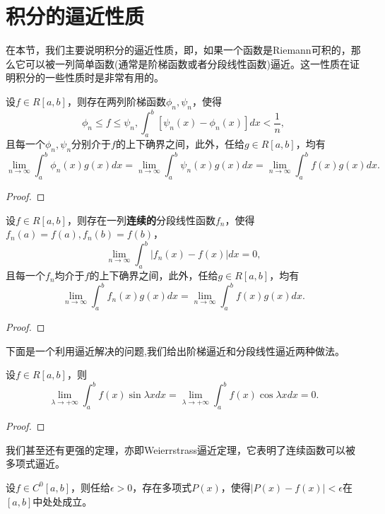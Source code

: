     \section{积分的逼近性质}
    在本节，我们主要说明积分的逼近性质，即，如果一个函数是Riemann可积的，那么它可以被一列简单函数(通常是阶梯函数或者分段线性函数)逼近。这一性质在证明积分的一些性质时是非常有用的。
    \begin{theorem}[阶梯逼近]
        设$f\in R\left[a,b\right]$，则存在两列阶梯函数$\phi_n,\psi_n$，使得$$\phi_n\leq f\leq\psi_n,\int_{a}^{b}\left[\psi_n(x)-\phi_n(x)\right]dx<\frac{1}{n},$$
        且每一个$\phi_n,\psi_n$分别介于$f$的上下确界之间，此外，任给$g\in R\left[a,b\right]$，均有$$\lim\limits_{n\rightarrow\infty}\int_{a}^{b}\phi_n(x)g(x)dx = \lim\limits_{n\rightarrow\infty}\int_{a}^{b}\psi_n(x)g(x)dx = \lim\limits_{n\rightarrow\infty}\int_{a}^{b}f(x)g(x)dx.$$
    \end{theorem}
    \begin{proof}
        
    \end{proof}
    \begin{theorem}[分段线性逼近]
        设$f\in R\left[a,b\right]$，则存在一列\textbf{连续的}分段线性函数$f_n$，使得$f_n(a)=f(a),f_n(b)=f(b)$，$$\lim\limits_{n\rightarrow\infty}\int_{a}^{b}\left|f_n(x)-f(x)\right|dx =0,$$
        且每一个$f_n$均介于$f$的上下确界之间，此外，任给$g\in R\left[a,b\right]$，均有$$\lim\limits_{n\rightarrow\infty}\int_{a}^{b}f_n(x)g(x)dx = \lim\limits_{n\rightarrow\infty}\int_{a}^{b}f(x)g(x)dx.$$
    \end{theorem}
    \begin{proof}
        
    \end{proof}
    下面是一个利用逼近解决的问题,我们给出阶梯逼近和分段线性逼近两种做法。
    \begin{example}
        设$f\in R\left[a,b\right]$，则$$\lim\limits_{\lambda\rightarrow +\infty}\int_{a}^{b}f(x)\sin{\lambda x}dx=\lim\limits_{\lambda\rightarrow +\infty}\int_{a}^{b}f(x)\cos{\lambda x}dx= 0.$$
    \end{example}
    \begin{proof}
        
    \end{proof}
    我们甚至还有更强的定理，亦即Weierrstrass逼近定理，它表明了连续函数可以被多项式逼近。
    \begin{theorem}[Weierrstrass逼近定理]
        设$f\in C^0\left[a,b\right]$，则任给$\epsilon>0$，存在多项式$P(x)$，使得$\left|P(x)-f(x)\right|<\epsilon$在$\left[a,b\right]$中处处成立。
    \end{theorem}
